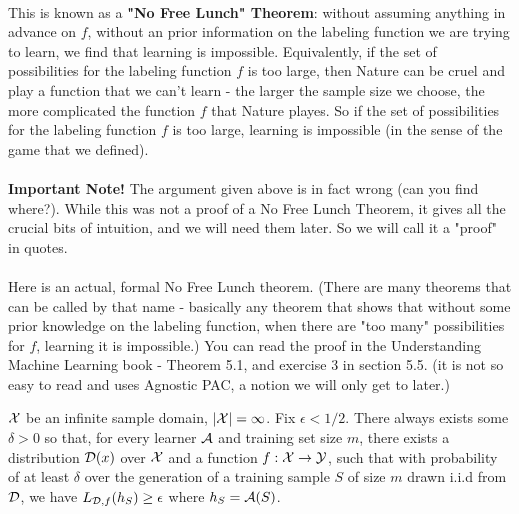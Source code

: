 ~\\
This is known as a {\bf "No Free Lunch" Theorem}: without assuming anything in advance on $f$, without an prior information on the labeling function we are trying to learn, we find that learning is impossible. Equivalently, if the set of possibilities for the labeling function $f$ is too large, then Nature can be cruel and play a function that we can't learn - the larger the sample size we choose, the more complicated the function $f$ that Nature playes. So if the set of possibilities for the labeling function $f$ is too large, learning is impossible (in the sense of the game that we defined).
\\~\\
{\bf Important Note!} The argument given above is in fact wrong (can you find where?). While this was not a proof of a No Free Lunch Theorem, it gives all the crucial bits of intuition, and we will need them later. So we will call it a "proof" in quotes. 
\\~\\
Here is an actual, formal No Free Lunch theorem. (There are many theorems that can be called by that name - basically any theorem that shows that without some prior knowledge on the labeling function, when there are "too many" possibilities for $f$, learning it is impossible.) You can read the proof in  the Understanding Machine Learning book - Theorem 5.1, and exercise 3 in section 5.5. (it is not so easy to read and uses Agnostic PAC, a notion we will only get to later.) 


\begin{theorem}
 $\mathcal{X}$ be an infinite sample domain, $|\mathcal{X}|=\infty$. Fix $\epsilon < 1/2$. There always exists some $\delta>0$ so that, for every learner $\mathcal{A}$ and training set size $m$, there exists a distribution $\mathcal{D}(x)$ over $\mathcal{X}$ and a function  $f:\mathcal{X}\to\mathcal{Y}$, such that with probability of at least $\delta$ over the generation of a training sample $S$ of size $m$ drawn i.i.d from $\mathcal{D}$, we have
   $L_{\mathcal{D},f}(h_S) \ge \epsilon$ where $h_S=\mathcal{A}(S)$.
\end{theorem}



